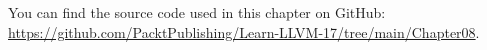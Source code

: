 You can find the source code used in this chapter on GitHub: \url{https://github.com/PacktPublishing/Learn-LLVM-17/tree/main/Chapter08}.